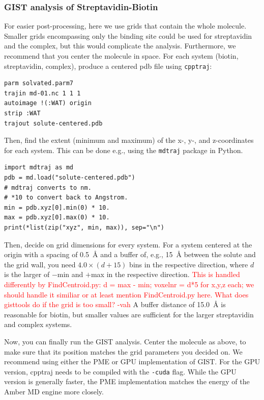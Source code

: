 \documentclass[9pt,tutorial]{livecoms}
\newcommand{\software}{\texttt}
\newcommand{\todo}{\textcolor{red}}
\newcommand\inlinecode{\texttt}
\begin{document}
\subsubsection{GIST analysis of Streptavidin-Biotin}
For easier post-processing, here we use grids that contain the whole molecule.
Smaller grids encompassing only the binding site could be used for streptavidin and the complex, but this would complicate the analysis.
Furthermore, we recommend that you center the molecule in space.
For each system (biotin, streptavidin, complex), produce a centered pdb file using \software{cpptraj}:
\begin{lstlisting}[style=cpptraj]
parm solvated.parm7
trajin md-01.nc 1 1 1
autoimage !(:WAT) origin
strip :WAT
trajout solute-centered.pdb
\end{lstlisting}

Then, find the extent (minimum and maximum) of the x-, \mbox{y-,} and z-coordinates for each system.
This can be done e.g., using the \software{mdtraj} package in Python.
\begin{lstlisting}[style=python]
import mdtraj as md
pdb = md.load("solute-centered.pdb")
# mdtraj converts to nm.
# *10 to convert back to Angstrom.
min = pdb.xyz[0].min(0) * 10.
max = pdb.xyz[0].max(0) * 10.
print(*list(zip("xyz", min, max)), sep="\n")
\end{lstlisting}
Then, decide on grid dimensions for every system.
For a system centered at the origin with a spacing of \SI{0.5}{\angstrom} and a buffer of, e.g., \SI{15}{\angstrom} between the solute and the grid wall, you need $4.0\times (d+15)$ bins in the respective direction, where $d$ is the larger of $-$min and $+$max in the respective direction.
\todo{ This is handled differently by FindCentroid.py: d = max - min; voxelnr = 
d*5 for x,y,z each; we should handle it similiar or at least mention 
FindCentroid.py here. 
What does gisttools do if the grid is too small? -vah }
A buffer distance of \SI{15.0}{\angstrom} is reasonable for biotin, but smaller values are sufficient for the larger streptavidin and complex systems.

Now, you can finally run the GIST analysis.
Center the molecule as above, to make sure that its position matches the grid parameters you decided on.
We recommend using either the PME or GPU implementation of GIST.
For the GPU version, cpptraj needs to be compiled with the \inlinecode{-cuda} flag.
While the GPU version is generally faster, the PME implementation matches the energy of the Amber MD engine more closely.
\end{document}
